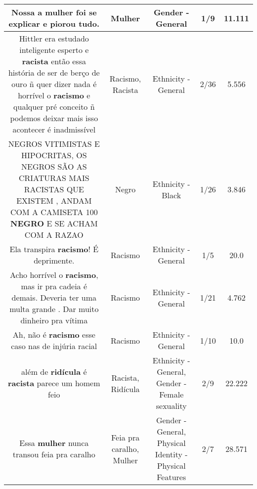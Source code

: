 \documentclass[11pt]{article}
\newlength\mylength
\begin{document}
\begin{center}
\begin{longtable}{|C{.65\mylength}|C{.30\mylength}|C{.12\mylength}|C{.12\mylength}|C{.12\mylength}|}
  \small Nossa a \textbf{mulher} foi se explicar e piorou tudo.\normalsize   & Mulher & Gender - General & 1/9 & 11.111 \\  \hline
  \small Hittler era estudado inteligente esperto e \textbf{racista} então essa história de ser de berço de ouro ñ quer dizer nada é horrível o \textbf{racismo} e qualquer pré conceito ñ podemos deixar mais isso acontecer é inadmissível\normalsize   & Racismo, Racista & Ethnicity - General & 2/36 & 5.556 \\  \hline
  \small NEGROS VITIMISTAS E HIPOCRITAS, OS NEGROS SÃO AS CRIATURAS MAIS RACISTAS QUE EXISTEM , ANDAM COM A CAMISETA 100 \textbf{NEGRO} E SE ACHAM COM A RAZAO\normalsize   & Negro & Ethnicity - Black & 1/26 & 3.846 \\  \hline
  \small Ela transpira \textbf{racismo}! É deprimente.\normalsize   & Racismo & Ethnicity - General & 1/5 & 20.0 \\  \hline
  \small Acho horrível o \textbf{racismo}, mas ir pra cadeia é demais. Deveria ter uma multa grande . Dar muito dinheiro pra vítima\normalsize   & Racismo & Ethnicity - General & 1/21 & 4.762 \\  \hline
  \small Ah, não é \textbf{racismo} esse caso nas de injúria racial\normalsize   & Racismo & Ethnicity - General & 1/10 & 10.0 \\  \hline
  \small além de \textbf{ridícula} é \textbf{racista} parece um homem feio\normalsize   & Racista, Ridícula & Ethnicity - General, Gender - Female sexuality & 2/9 & 22.222 \\  \hline
  \small Essa \textbf{mulher} nunca transou feia pra caralho\normalsize   & Feia pra caralho, Mulher & Gender - General, Physical Identity - Physical Features & 2/7 & 28.571 \\  \hline

\end{longtable}
\end{center}
\end{document}
